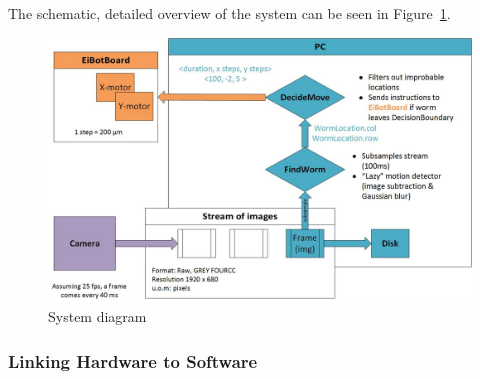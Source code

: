 \documentclass[main.tex]{subfiles}
\begin{document}
The schematic, detailed overview of the system can be seen in Figure~\ref{fig:system}. 

\begin{figure}[!htbp]
  \centering
  \includegraphics[scale = 0.5]{system}
  \caption{System diagram}
  \label{fig:system}
\end{figure}



\subsubsection{Linking Hardware to Software}
\label{sss:hslink}
\end{document}
